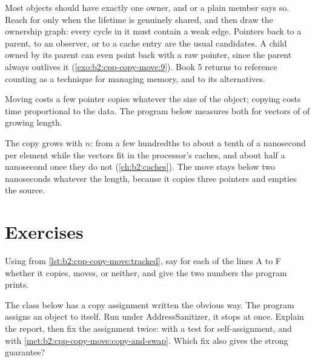 \begin{inpractice}
Most objects should have exactly one owner, and  or a plain member says so. Reach for
 only when the lifetime is genuinely shared, and then draw the ownership graph: every cycle
in it must contain a weak edge. Pointers back to a parent, to an observer, or to a cache entry are the usual
candidates. A child owned by its parent can even point back with a raw pointer, since the parent always outlives it
(\cref{exo:b2:cpp-copy-move:9}). Book 5 returns to reference counting as a technique for managing memory, and to its
alternatives.
\end{inpractice}

Moving costs a few pointer copies whatever the size of the object; copying costs time proportional to the data. The
program below measures both for vectors of  of growing length.

\label{lst:b2:cpp-copy-move:copy-vs-move}

\label{out:b2:cpp-copy-move:copy-vs-move}

The copy grows with $n$: from a few hundredths to about a tenth of a nanosecond per element while the vectors fit in
the processor's caches, and about half a nanosecond once they do not (\cref{ch:b2:caches}). The move stays below two
nanoseconds whatever the length, because it copies three pointers and empties the source.

\section{Exercises}\label{sec:b2:cpp-copy-move:exercises}

\begin{exercise}[$\star$]\label{exo:b2:cpp-copy-move:1}
Using  from \cref{lst:b2:cpp-copy-move:tracked}, say for each of the lines A to F whether it copies,
moves, or neither, and give the two numbers the program prints.
\end{exercise}

\begin{exercise}[$\star$]\label{exo:b2:cpp-copy-move:2}
The class  below has a copy assignment written the obvious way. The program assigns an object to
itself. Run under AddressSanitizer, it stops at once. Explain the report, then fix the assignment twice: with a test
for self-assignment, and with \cref{met:b2:cpp-copy-move:copy-and-swap}. Which fix also gives the strong guarantee?
\end{exercise}

